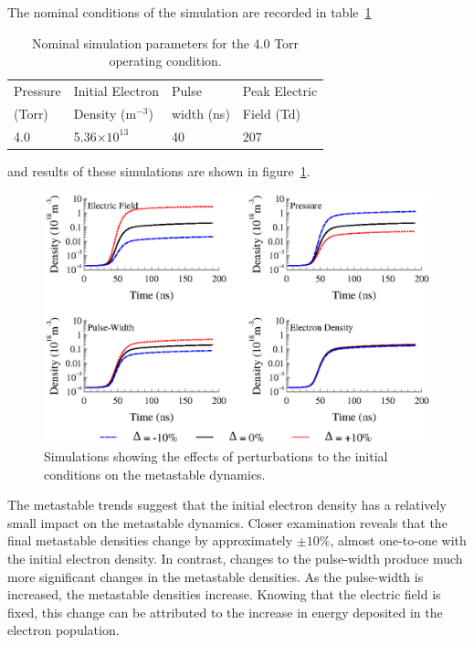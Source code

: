 The nominal conditions of the simulation are recorded in table~\ref{tbl:nominal}
\begin{table}
  \centering
  \caption{Nominal simulation parameters for the 4.0 Torr operating condition.}
  \begin{tabular}{llll}
    \toprule
    Pressure & Initial Electron    & Pulse      & Peak Electric \\
    (Torr)   & Density (m$^{-3}$)  & width (ns) & Field (Td)\\ 
    \midrule
    4.0      & 5.36$\times10^{13}$ & 40         & 207 \\
    \bottomrule
  \end{tabular}
  \label{tbl:nominal}
\end{table}
and results of these simulations are shown in figure~\ref{fig:perturbed}.
\begin{figure}
  \centering
  \includegraphics{./chapters/modeling/figures/perturbed.eps}
  \caption{Simulations showing the effects of perturbations to the initial
  conditions on the metastable dynamics.}
  \label{fig:perturbed}
\end{figure}
The metastable trends suggest that the initial electron density has a relatively
small impact on the metastable dynamics. Closer examination reveals that the
final metastable densities change by approximately $\pm10\%$, almost one-to-one
with the initial electron density. In contrast, changes to the pulse-width
produce much more significant changes in the metastable densities. As the
pulse-width is increased, the metastable densities increase. Knowing that the
electric field is fixed, this change can be attributed to the increase in energy
deposited in the electron population.

